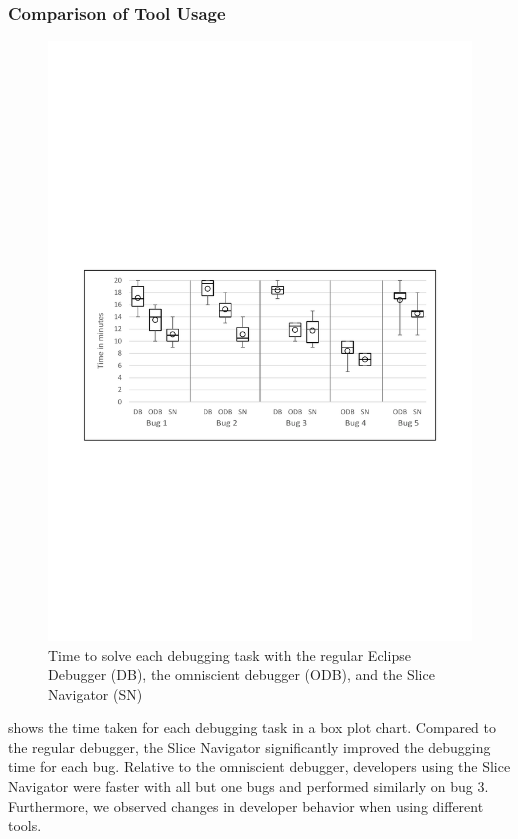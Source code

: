 \subsubsection{Comparison of Tool Usage}

\begin{figure}
	\centering %
		\includegraphics[width=\linewidth]{img/chart-times3}
	\caption{Time to solve each debugging task with the regular Eclipse Debugger (DB), the omniscient debugger (ODB), and the Slice Navigator (SN)}
	\label{fig:charttimes}
\end{figure}

 shows the time taken for each debugging task in a box plot chart.
Compared to the regular debugger, the Slice Navigator significantly improved the debugging time for each bug.
Relative to the omniscient debugger, developers using the Slice Navigator were faster with all but one bugs and performed similarly on bug 3.
Furthermore, we observed changes in developer behavior when using different tools.


